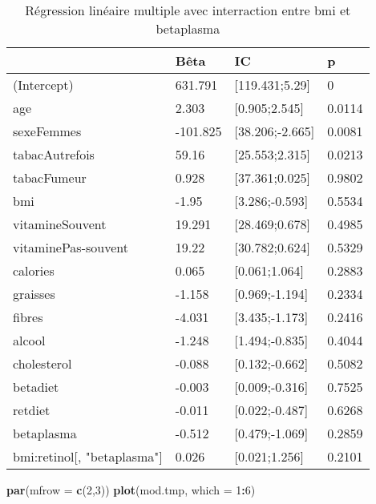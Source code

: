 \documentclass[]{article}
\newenvironment{Shaded}{\begin{snugshade}}{\end{snugshade}}
\newcommand{\KeywordTok}[1]{\textcolor[rgb]{0.13,0.29,0.53}{\textbf{#1}}}
\newcommand{\DataTypeTok}[1]{\textcolor[rgb]{0.13,0.29,0.53}{#1}}
\newcommand{\DecValTok}[1]{\textcolor[rgb]{0.00,0.00,0.81}{#1}}
\newcommand{\OperatorTok}[1]{\textcolor[rgb]{0.81,0.36,0.00}{\textbf{#1}}}
\newcommand{\NormalTok}[1]{#1}
\begin{document}
\begin{table}

\caption{\label{tab:unnamed-chunk-72}Régression linéaire multiple avec interraction entre bmi et betaplasma}
\centering
\begin{tabular}[t]{l|l|l|l}
\hline
  & Bêta & IC & p\\
\hline
\rowcolor[HTML]{BBD2E1}  (Intercept) & 631.791 & [119.431;5.29] & 0\\
\hline
age & 2.303 & [0.905;2.545] & 0.0114\\
\hline
\rowcolor[HTML]{BBD2E1}  sexeFemmes & -101.825 & [38.206;-2.665] & 0.0081\\
\hline
tabacAutrefois & 59.16 & [25.553;2.315] & 0.0213\\
\hline
\rowcolor[HTML]{BBD2E1}  tabacFumeur & 0.928 & [37.361;0.025] & 0.9802\\
\hline
bmi & -1.95 & [3.286;-0.593] & 0.5534\\
\hline
\rowcolor[HTML]{BBD2E1}  vitamineSouvent & 19.291 & [28.469;0.678] & 0.4985\\
\hline
vitaminePas-souvent & 19.22 & [30.782;0.624] & 0.5329\\
\hline
\rowcolor[HTML]{BBD2E1}  calories & 0.065 & [0.061;1.064] & 0.2883\\
\hline
graisses & -1.158 & [0.969;-1.194] & 0.2334\\
\hline
\rowcolor[HTML]{BBD2E1}  fibres & -4.031 & [3.435;-1.173] & 0.2416\\
\hline
alcool & -1.248 & [1.494;-0.835] & 0.4044\\
\hline
\rowcolor[HTML]{BBD2E1}  cholesterol & -0.088 & [0.132;-0.662] & 0.5082\\
\hline
betadiet & -0.003 & [0.009;-0.316] & 0.7525\\
\hline
\rowcolor[HTML]{BBD2E1}  retdiet & -0.011 & [0.022;-0.487] & 0.6268\\
\hline
betaplasma & -0.512 & [0.479;-1.069] & 0.2859\\
\hline
\rowcolor[HTML]{BBD2E1}  bmi:retinol[, "betaplasma"] & 0.026 & [0.021;1.256] & 0.2101\\
\hline
\end{tabular}
\end{table}

\begin{Shaded}
\begin{Highlighting}[]
\KeywordTok{par}\NormalTok{(}\DataTypeTok{mfrow =} \KeywordTok{c}\NormalTok{(}\DecValTok{2}\NormalTok{,}\DecValTok{3}\NormalTok{))}
\KeywordTok{plot}\NormalTok{(mod.tmp, }\DataTypeTok{which =} \DecValTok{1}\OperatorTok{:}\DecValTok{6}\NormalTok{)}
\end{Highlighting}
\end{Shaded}
\end{document}
